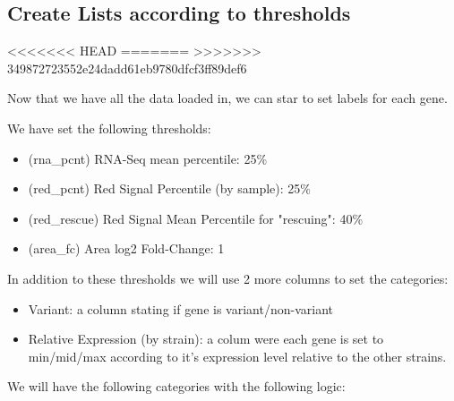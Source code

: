 \documentclass[11pt]{article}
\begin{document}
\subsection{Create Lists according to thresholds}
<<<<<<< HEAD
\label{sec:org5b85d47}
=======
\label{sec:org4ed0248}
>>>>>>> 349872723552e24dadd61eb9780dfcf3ff89def6

Now that we have all the data loaded in, we can star to set labels for each gene.

We have set the following thresholds:
\begin{itemize}
\item (rna\_pcnt) RNA-Seq mean percentile: 25\%
\item (red\_pcnt) Red Signal Percentile (by sample): 25\%
\item (red\_rescue) Red Signal Mean Percentile for "rescuing": 40\%
\item (area\_fc) Area log2 Fold-Change: 1
\end{itemize}

In addition to these thresholds we will use 2 more columns to set the categories:
\begin{itemize}
\item Variant: a column stating if gene is variant/non-variant
\item Relative Expression (by strain): a colum were each gene is set to min/mid/max according to it's expression level relative to the other strains.
\end{itemize}

We will have the following categories with the following logic:
\end{document}
